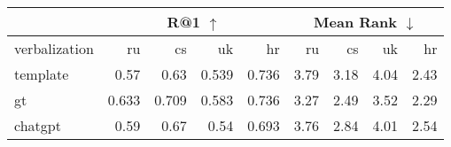 \begin{tabular}{|l|rrrr|rrrr|} 
 \hline & \multicolumn{4}{c|}{R@1 $\uparrow$} & \multicolumn{4}{c|}{Mean Rank $\downarrow$} \\
\hline
 verbalization   &    ru &    cs &    uk &    hr &   ru &   cs &   uk &   hr \\
\hline
 template        & 0.57  & 0.63  & 0.539 & 0.736 & 3.79 & 3.18 & 4.04 & 2.43 \\
 gt              & 0.633 & 0.709 & 0.583 & 0.736 & 3.27 & 2.49 & 3.52 & 2.29 \\
 chatgpt         & 0.59  & 0.67  & 0.54  & 0.693 & 3.76 & 2.84 & 4.01 & 2.54 \\
\hline
\end{tabular}